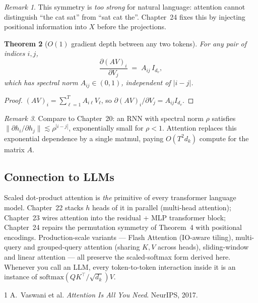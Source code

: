 \documentclass[11pt]{article}
\newtheorem{theorem}{Theorem}[section]
\theoremstyle{remark}
\newtheorem{remark}[theorem]{Remark}
\begin{document}
\begin{remark}
This symmetry is \emph{too strong} for natural language: attention cannot distinguish ``the cat sat'' from ``sat cat the''. Chapter~24 fixes this by injecting positional information into $X$ before the projections.
\end{remark}

\begin{theorem}[$O(1)$ gradient depth between any two tokens]
\label{thm:O1grad}
For any pair of indices $i,j$,
\[
\frac{\partial (AV)_i}{\partial V_j} \;=\; A_{ij} \, I_{d_v},
\]
which has spectral norm $A_{ij} \in (0,1)$, independent of $|i - j|$.
\end{theorem}
\begin{proof}
$(AV)_i = \sum_{\ell=1}^{T} A_{i\ell} V_\ell$, so $\partial (AV)_i/\partial V_j = A_{ij} I_{d_v}$. \qedhere
\end{proof}

\begin{remark}
Compare to Chapter~20: an RNN with spectral norm $\rho$ satisfies $\|\partial h_i/\partial h_j\| \lesssim \rho^{|i-j|}$, exponentially small for $\rho < 1$. Attention replaces this exponential dependence by a single matmul, paying $O(T^2 d_k)$ compute for the matrix $A$.
\end{remark}

\subsection*{Connection to LLMs}

Scaled dot-product attention is \emph{the} primitive of every transformer language model. Chapter~22 stacks $h$ heads of it in parallel (multi-head attention); Chapter~23 wires attention into the residual + MLP transformer block; Chapter~24 repairs the permutation symmetry of Theorem~4 with positional encodings. Production-scale variants --- Flash Attention (IO-aware tiling), multi-query and grouped-query attention (sharing $K,V$ across heads), sliding-window and linear attention --- all preserve the scaled-softmax form derived here. Whenever you call an LLM, every token-to-token interaction inside it is an instance of $\mathrm{softmax}(QK^\top/\sqrt{d_k})V$.

\begin{thebibliography}{1}
 A.~Vaswani et al. \emph{Attention Is All You Need}. NeurIPS, 2017.
\end{thebibliography}

\end{document}
